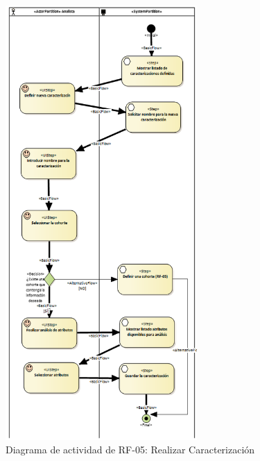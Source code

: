 \begin{figure}[H]
    \centering
    \includegraphics[width=0.65\textwidth]{figures/FR05.png}
    \caption{Diagrama de actividad de RF-05: Realizar Caracterización}
    \label{fig:FR05}
\end{figure}

